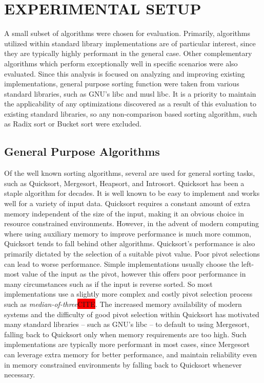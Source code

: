 \documentclass[letter, 12pt, conference]{ieeeconf}
\newcommand{\todocite}{\colorbox{red}{CITE}}
\begin{document}
\section{EXPERIMENTAL SETUP}

A small subset of algorithms were chosen for evaluation. Primarily, algorithms
utilized within standard library implementations are of particular interest,
since they are typically highly performant in the general case. Other
complementary algorithms which perform exceptionally well in specific scenarios
were also evaluated. Since this analysis is focused on analyzing and improving
existing implementations, general purpose sorting function were taken from
various standard libraries, such as GNU's libc\parencite{glibc} and musl
libc\parencite{musl_libc}. It is a priority to maintain the applicability of any
optimizations discovered as a result of this evaluation to existing standard
libraries, so any non-comparison based sorting algorithm, such as Radix sort or
Bucket sort were excluded.

\subsection{General Purpose Algorithms}

Of the well known sorting algorithms, several are used for general sorting
tasks, such as Quicksort, Mergesort, Heapsort, and Introsort. Quicksort has been
a staple algorithm for decades. It is well known to be easy to implement and
works well for a variety of input data. Quicksort requires a constant amount of
extra memory independent of the size of the input, making it an obvious choice
in resource constrained environments. However, in the advent of modern computing
where using auxiliary memory to improve performance is much more common,
Quicksort tends to fall behind other algorithms. Quicksort's performance is also
primarily dictated by the selection of a suitable pivot value. Poor pivot
selections can lead to worse performance. Simple implementations usually choose
the left-most value of the input as the pivot, however this offers poor
performance in many circumstances such as if the input is reverse sorted. So
most implementations use a slightly more complex and costly pivot selection
process such as \textit{median-of-three}\todocite. The increased memory
availability of modern systems and the difficulty of good pivot selection within
Quicksort has motivated many standard libraries -- such as GNU's libc -- to
default to using Mergesort, falling back to Quicksort only when memory
requirements are too high\parencite{glibc}. Such implementations are typically
more performant in most cases, since Mergesort can leverage extra memory for
better performance, and maintain reliability even in memory constrained
environments by falling back to Quicksort whenever necessary.
\end{document}
